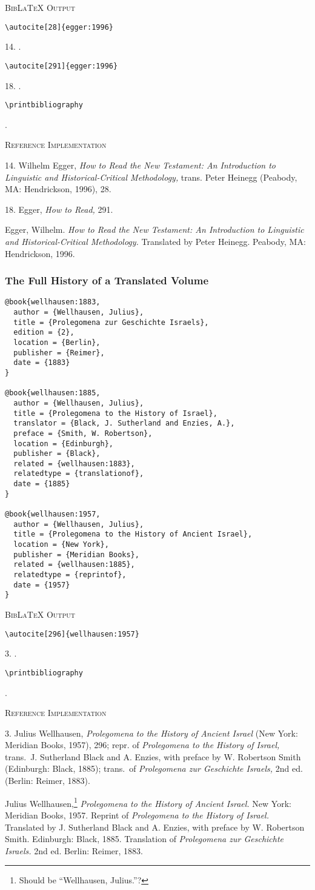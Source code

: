 \documentclass[a4paper]{article}
\newcommand\citetest[5]{%
  {\textsc{BibLaTeX Output}\par
   \nobreak
   \texttt{\textbackslash autocite[#2]\{#5\}}\par
   \color{biblatex-colour}
   #1. \cite[#2]{#5}.\par
   \color{black}
   \texttt{\textbackslash autocite[#4]\{#5\}}\par
   \color{biblatex-colour}
   #3. \cite[#4]{#5}.\par
   \color{black}
   \texttt{\textbackslash printbibliography}\par
   \color{biblatex-colour}
   \hangindent\bibindent\bibentrycite{#5}.\par}}
\newcommand\citetestns[3]{%
  {\textsc{BibLaTeX Output}\par
   \nobreak
   \texttt{\textbackslash autocite[#2]\{#3\}}\par
   \color{biblatex-colour}
   #1. \cite[#2]{#3}.\par
   \color{black}
   \texttt{\textbackslash printbibliography}\par
   \color{biblatex-colour}
   \sloppy\hangindent\bibindent\bibentrycite{#3}.\par}}
\newenvironment{refimp}{%
  \begin{minipage}{\linewidth}
    \setlength{\parskip}{1ex}
    \textsc{Reference Implementation}\par
    \nobreak
    \color{reference-colour}
}{\end{minipage}}
\begin{document}
\citetest{14}{28}{18}{291}{egger:1996}

\begin{refimp}
  14. Wilhelm Egger, \emph{How to Read the New Testament: An Introduction to
  Linguistic and Historical-Critical Methodology,} trans. Peter Heinegg
  (Peabody, MA: Hendrickson, 1996), 28.

  18. Egger, \emph{How to Read,} 291.
  
  \hangindent\bibindent Egger, Wilhelm. \emph{How to Read the New Testament:
  An Introduction to Linguistic and Historical-Critical Methodology.}
  Translated by Peter Heinegg. Peabody, MA: Hendrickson, 1996.
\end{refimp}

\subsubsection{The Full History of a Translated Volume}

\begin{lstlisting}
@book{wellhausen:1883,
  author = {Wellhausen, Julius},
  title = {Prolegomena zur Geschichte Israels},
  edition = {2},
  location = {Berlin},
  publisher = {Reimer},
  date = {1883}
}

@book{wellhausen:1885,
  author = {Wellhausen, Julius},
  title = {Prolegomena to the History of Israel},
  translator = {Black, J. Sutherland and Enzies, A.},
  preface = {Smith, W. Robertson},
  location = {Edinburgh},
  publisher = {Black},
  related = {wellhausen:1883},
  relatedtype = {translationof},
  date = {1885}
}

@book{wellhausen:1957,
  author = {Wellhausen, Julius},
  title = {Prolegomena to the History of Ancient Israel},
  location = {New York},
  publisher = {Meridian Books},
  related = {wellhausen:1885},
  relatedtype = {reprintof},
  date = {1957}
}
\end{lstlisting}

\citetestns{3}{296}{wellhausen:1957}

\begin{refimp}
  3. Julius Wellhausen, \emph{Prolegomena to the History of Ancient Israel}
  (New York: Meridian Books, 1957), 296; repr. of \emph{Prolegomena to the
  History of Israel,} trans.\ J. Sutherland Black and A. Enzies, with preface
  by W. Robertson Smith (Edinburgh: Black, 1885); trans.\ of \emph{Prolegomena
  zur Geschichte Israels,} 2nd ed. (Berlin: Reimer, 1883).

  \hangindent\bibindent Julius Wellhausen,\footnote{Should be “Wellhausen,
  Julius.”?} \emph{Prolegomena to the History of Ancient Israel.} New York:
  Meridian Books, 1957. Reprint of \emph{Prolegomena to the History of
  Israel.} Translated by J. Sutherland Black and A. Enzies, with preface by W.
  Robertson Smith. Edinburgh: Black, 1885. Translation of \emph{Prolegomena
  zur Geschichte Israels.} 2nd ed. Berlin: Reimer, 1883.
\end{refimp}
\end{document}
